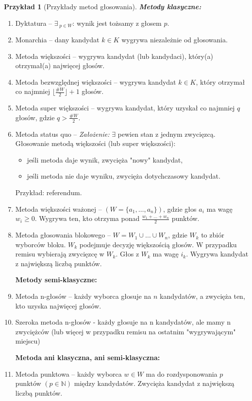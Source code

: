 \documentclass[12pt,a4paper]{article}
\theoremstyle{break}
\newtheorem{example}{Przykład}[section]
\begin{document}
\begin{example}[Przykłady metod głosowania]
	\textbf{Metody klasyczne:}
\end{example}
\begin{enumerate}[1)]
	\item Dyktatura – $\exists_{\;p \in W}$: wynik jest tożsamy z głosem $p$.
	\item Monarchia – dany kandydat $k \in K$ wygrywa niezależnie od głosowania.
	\item Metoda większości – wygrywa kandydat (lub kandydaci), który(a) otrzymał(a) najwięcej głosów.
	\item Metoda bezwzględnej większości – wygrywa kandydat $k \in K$, który otrzymał co najmniej $\lfloor\frac{\# W}{2}\rfloor + 1$ głosów.
	\item Metoda super większości – wygrywa kandydat, który uzyskał co najmniej $q$ głosów, gdzie $q > \frac{\# W}{2}$.
	\item Metoda status quo – \textit{Założenie:} $\exists$ pewien stan z jednym zwycięzcą.
	\\ Głosowanie metodą większości (lub super większości):
	\begin{itemize}
		\item jeśli metoda daje wynik, zwycięża "nowy" kandydat,
		\item jeśli metoda nie daje wyniku, zwycięża dotychczasowy kandydat.
	\end{itemize}
	Przykład: referendum.
	\item Metoda większości ważonej – $(W = \{a_1,\dots,a_n\})$, gdzie głos $a_i$ ma wagę $w_i \geq 0$. Wygrywa ten, kto otrzyma ponad $\frac{w_1 + \dots + w_n}{2}$ punktów.
	\item Metoda głosowania blokowego – $W = W_1 \cup \dots \cup W_n$, gdzie $W_k$ to zbiór wyborców bloku. $W_k$ podejmuje decyzję większością głosów. W przypadku remisu wybierają zwycięzcę w $W_k$. Głos z $W_k$ ma wagę $i_k$. Wygrywa kandydat z największą liczbą punktów.
	
	\textbf{Metody semi-klasyczne:}
	\item Metoda n-głosów – każdy wyborca głosuje na $n$ kandydatów, a zwycięża ten, kto uzyska najwięcej głosów.
	\item Szeroka metoda n-głosów - każdy głosuje na n kandydatów, ale mamy n zwyciężców (lub więcej w przypadku remisu na ostatnim "wygrywającym" miejscu)
	
	\textbf{Metoda ani klasyczna, ani semi-klasyczna:}
	\item Metoda punktowa – każdy wyborca $w \in W$ ma do rozdysponowania $p$ punktów $(p \in \mathbb{N})$ między kandydatów. Zwycięża kandydat z największą liczbą punktów.
\end{enumerate}
\end{document}
